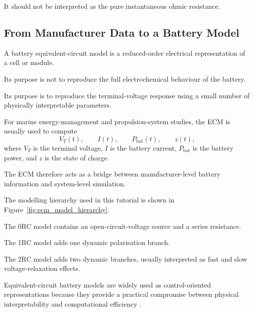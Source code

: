 \documentclass[a4paper,12pt]{article}
\begin{document}
It should not be interpreted as the pure instantaneous ohmic resistance.

\subsection{From Manufacturer Data to a Battery Model}

A battery equivalent-circuit model is a reduced-order electrical representation of a cell or module.

Its purpose is not to reproduce the full electrochemical behaviour of the battery.

Its purpose is to reproduce the terminal-voltage response using a small number of physically interpretable parameters.

For marine energy-management and propulsion-system studies, the ECM is usually used to compute
\[
V_T(t),
\qquad
I(t),
\qquad
P_{\mathrm{bat}}(t),
\qquad
z(t),
\]
where \(V_T\) is the terminal voltage, \(I\) is the battery current, \(P_{\mathrm{bat}}\) is the battery power, and \(z\) is the state of charge.

The ECM therefore acts as a bridge between manufacturer-level battery information and system-level simulation.

The modelling hierarchy used in this tutorial is shown in Figure~\ref{fig:ecm_model_hierarchy}.

The 0RC model contains an open-circuit-voltage source and a series resistance.

The 1RC model adds one dynamic polarisation branch.

The 2RC model adds two dynamic branches, usually interpreted as fast and slow voltage-relaxation effects.

Equivalent-circuit battery models are widely used as control-oriented representations because they provide a practical compromise between physical interpretability and computational efficiency \cite{chen_rincon_mora_2006,hu_li_peng_2012,plett_bms_vol2}.
\end{document}
